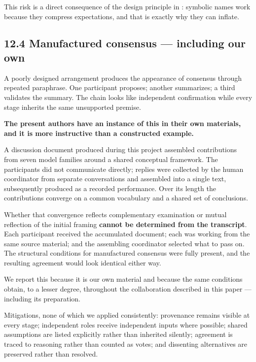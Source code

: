 This risk is a direct consequence of the design principle in : symbolic names work because they compress expectations, and that is exactly why they can inflate.


\subsection*{12.4 Manufactured consensus — including our own}
\label{sec:en:12.4}

A poorly designed arrangement produces the appearance of consensus through repeated paraphrase. One participant proposes; another summarizes; a third validates the summary. The chain looks like independent confirmation while every stage inherits the same unsupported premise.

\textbf{The present authors have an instance of this in their own materials, and it is more instructive than a constructed example.}

A discussion document produced during this project assembled contributions from seven model families around a shared conceptual framework. The participants did not communicate directly; replies were collected by the human coordinator from separate conversations and assembled into a single text, subsequently produced as a recorded performance. Over its length the contributions converge on a common vocabulary and a shared set of conclusions.

Whether that convergence reflects complementary examination or mutual reflection of the initial framing \textbf{cannot be determined from the transcript}. Each participant received the accumulated document; each was working from the same source material; and the assembling coordinator selected what to pass on. The structural conditions for manufactured consensus were fully present, and the resulting agreement would look identical either way.

We report this because it is our own material and because the same conditions obtain, to a lesser degree, throughout the collaboration described in this paper — including its preparation.

Mitigations, none of which we applied consistently: provenance remains visible at every stage; independent roles receive independent inputs where possible; shared assumptions are listed explicitly rather than inherited silently; agreement is traced to reasoning rather than counted as votes; and dissenting alternatives are preserved rather than resolved.


